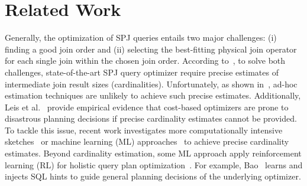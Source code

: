 \section{Related Work}
\label{sec:RealtedWork}

Generally, the optimization of SPJ queries entails two major challenges: (i) finding a good join order and (ii) selecting the best-fitting physical join operator for each single join within the chosen join order. 
According to~\cite{DBLP:conf/pods/Chaudhuri98}, to solve both challenges, state-of-the-art SPJ query optimizer require precise estimates of intermediate join result sizes (cardinalities). 
Unfortunately, as shown in~\cite{DBLP:conf/icde/PerronSKS19}, ad-hoc estimation techniques are unlikely to achieve such precise estimates. 
Additionally, Leis et al.~\cite{DBLP:journals/pvldb/LeisGMBK015} provide empirical evidence that cost-based optimizers are prone to disastrous planning decisions if precise cardinality estimates cannot be provided. 
To tackle this issue, recent work investigates more computationally intensive sketches~\cite{DBLP:conf/sigmod/CaiBS19,DBLP:conf/sigmod/IzenovDRS21,DBLP:conf/sigmod/KipfVMKRLB0K19} or machine learning (ML) approaches~\cite{DBLP:journals/pvldb/HilprechtSKMKB20,DBLP:conf/cidr/KipfKRLBK19,DBLP:journals/pvldb/NegiMKMTKA21,DBLP:conf/sigmod/WoltmannHTHL19,DBLP:journals/pvldb/YangKLLDCS20} to achieve precise cardinality estimates. 
Beyond cardinality estimation, some ML approach apply reinforcement learning (RL) for holistic query plan optimization~\cite{DBLP:journals/corr/abs-1808-03196,DBLP:conf/sigmod/MarcusNMTAK21,DBLP:journals/pvldb/MarcusNMZAKPT19}. 
For example, Bao~\cite{DBLP:conf/sigmod/MarcusNMTAK21} learns and injects SQL hints to guide general planning decisions of the underlying optimizer. 

